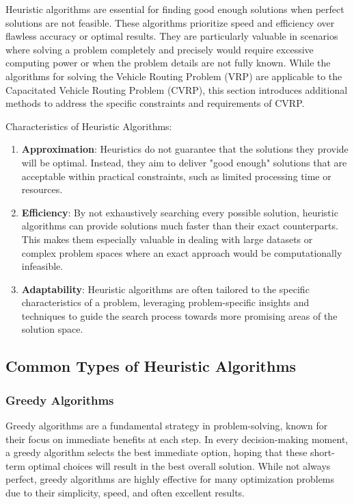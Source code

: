 \documentclass{article}
\begin{document}
    Heuristic algorithms are essential for finding good enough solutions when perfect solutions are not feasible. These algorithms prioritize speed and efficiency over flawless accuracy or optimal results. They are particularly valuable in scenarios where solving a problem completely and precisely would require excessive computing power or when the problem details are not fully known. While the algorithms for solving the Vehicle Routing Problem (VRP) are applicable to the Capacitated Vehicle Routing Problem (CVRP), this section introduces additional methods to address the specific constraints and requirements of CVRP. \cite{sharma2024metaheuristic}

    Characteristics of Heuristic Algorithms:
    \begin{enumerate}
        \item \textbf{Approximation}: Heuristics do not guarantee that the solutions they provide will be optimal. Instead, they aim to deliver "good enough" solutions that are acceptable within practical constraints, such as limited processing time or resources. \cite{sharma2024metaheuristic}
        \item \textbf{Efficiency}: By not exhaustively searching every possible solution, heuristic algorithms can provide solutions much faster than their exact counterparts. This makes them especially valuable in dealing with large datasets or complex problem spaces where an exact approach would be computationally infeasible. \cite{sharma2024metaheuristic}
        \item \textbf{Adaptability}: Heuristic algorithms are often tailored to the specific characteristics of a problem, leveraging problem-specific insights and techniques to guide the search process towards more promising areas of the solution space. \cite{sharma2024metaheuristic}
    \end{enumerate}

    \subsection{Common Types of Heuristic Algorithms}\label{itm:common-types-of-heuristic-algorithms}

    \subsubsection{Greedy Algorithms}
    \label{subsubsec:greedy_algorithms}

    Greedy algorithms are a fundamental strategy in problem-solving, known for their focus on immediate benefits at each step. In every decision-making moment, a greedy algorithm selects the best immediate option, hoping that these short-term optimal choices will result in the best overall solution. While not always perfect, greedy algorithms are highly effective for many optimization problems due to their simplicity, speed, and often excellent results.
\end{document}
